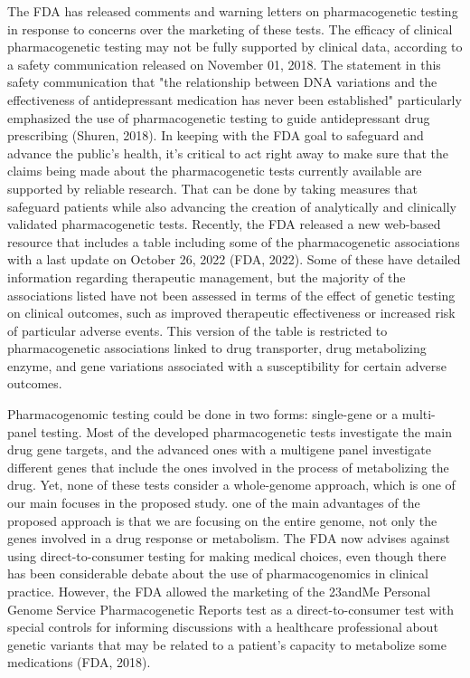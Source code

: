 \documentclass[
]{article}
\begin{document}
The FDA has released comments and warning letters on pharmacogenetic
testing in response to concerns over the marketing of these tests. The
efficacy of clinical pharmacogenetic testing may not be fully supported
by clinical data, according to a safety communication released on
November 01, 2018. The statement in this safety communication that "the
relationship between DNA variations and the effectiveness of
antidepressant medication has never been established" particularly
emphasized the use of pharmacogenetic testing to guide antidepressant
drug prescribing (Shuren, 2018). In keeping with the FDA goal to
safeguard and advance the public's health, it's critical to act right
away to make sure that the claims being made about the pharmacogenetic
tests currently available are supported by reliable research. That can
be done by taking measures that safeguard patients while also advancing
the creation of analytically and clinically validated pharmacogenetic
tests. Recently, the FDA released a new web-based resource that includes
a table including some of the pharmacogenetic associations with a last
update on October 26, 2022 (FDA, 2022). Some of these have detailed
information regarding therapeutic management, but the majority of the
associations listed have not been assessed in terms of the effect of
genetic testing on clinical outcomes, such as improved therapeutic
effectiveness or increased risk of particular adverse events. This
version of the table is restricted to pharmacogenetic associations
linked to drug transporter, drug metabolizing enzyme, and gene
variations associated with a susceptibility for certain adverse
outcomes.

Pharmacogenomic testing could be done in two forms: single-gene or a
multi-panel testing. Most of the developed pharmacogenetic tests
investigate the main drug gene targets, and the advanced ones with a
multigene panel investigate different genes that include the ones
involved in the process of metabolizing the drug. Yet, none of these
tests consider a whole-genome approach, which is one of our main focuses
in the proposed study. one of the main advantages of the proposed
approach is that we are focusing on the entire genome, not only the
genes involved in a drug response or metabolism. The FDA now advises
against using direct-to-consumer testing for making medical choices,
even though there has been considerable debate about the use of
pharmacogenomics in clinical practice. However, the FDA allowed the
marketing of the 23andMe Personal Genome Service Pharmacogenetic Reports
test as a direct-to-consumer test with special controls for informing
discussions with a healthcare professional about genetic variants that
may be related to a patient's capacity to metabolize some medications
(FDA, 2018).
\end{document}
